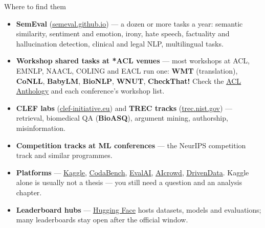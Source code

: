 \documentclass[aspectratio=169,11pt]{beamer}
\newcommand{\lnk}[2]{\href{#1}{\color{brandlight}\underline{#2}}}
\newcommand{\key}[1]{\textbf{\color{brand}#1}}
\begin{document}
\begin{frame}{Where to find them}
\footnotesize
\begin{itemize}
  \item \key{SemEval} (\lnk{https://semeval.github.io}{semeval.github.io}) ---
        a dozen or more tasks a year: semantic similarity, sentiment and
        emotion, irony, hate speech, factuality and hallucination detection,
        clinical and legal NLP, multilingual tasks.
  \item \key{Workshop shared tasks at *ACL venues} --- most workshops at ACL,
        EMNLP, NAACL, COLING and EACL run one: \textbf{WMT} (translation),
        \textbf{CoNLL}, \textbf{BabyLM}, \textbf{BioNLP}, \textbf{WNUT},
        \textbf{CheckThat!} Check the
        \lnk{https://aclanthology.org}{ACL Anthology} and each conference's
        workshop list.
  \item \key{CLEF labs} (\lnk{https://www.clef-initiative.eu}{clef-initiative.eu})
        and \key{TREC tracks} (\lnk{https://trec.nist.gov}{trec.nist.gov}) ---
        retrieval, biomedical QA (\textbf{BioASQ}), argument mining,
        authorship, misinformation.
  \item \key{Competition tracks at ML conferences} --- the NeurIPS competition
        track and similar programmes.
  \item \key{Platforms} --- \lnk{https://www.kaggle.com}{Kaggle},
        \lnk{https://www.codabench.org}{CodaBench},
        \lnk{https://eval.ai}{EvalAI},
        \lnk{https://www.aicrowd.com}{AIcrowd},
        \lnk{https://www.drivendata.org}{DrivenData}. Kaggle alone is usually
        not a thesis --- you still need a question and an analysis chapter.
  \item \key{Leaderboard hubs} --- \lnk{https://huggingface.co}{Hugging Face}
        hosts datasets, models and evaluations; many leaderboards stay open
        after the official window.
\end{itemize}
\end{frame}
\end{document}
